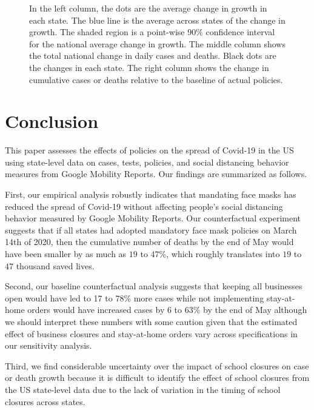 \documentclass[3p, longtitle]{elsarticle}
\theoremstyle{definition}
\begin{document}
\begin{figure}[ht]
\begin{minipage}{\linewidth}
    \begin{flushleft}
      \footnotesize In the left column, the dots are the average
      change in growth in each state. The blue line is the average
      across states of the change in growth. The shaded region is a
      point-wise 90\% confidence interval for the national average
      change in growth.  The middle column shows the total national
      change in daily cases and deaths. Black dots are the changes in each
      state.  The right column shows the change in cumulative cases or
      deaths relative to the baseline of actual policies.
    \end{flushleft}
  \end{minipage}
\end{figure}




\afterpage{\clearpage}

\section{Conclusion}


This paper assesses the effects of policies on the spread of Covid-19 in the US using state-level data on cases, tests, policies, and social distancing behavior measures from Google Mobility Reports. Our findings are summarized as follows.

First, our empirical analysis robustly indicates that mandating face masks has
reduced the spread of Covid-19 without affecting people's social
distancing behavior measured by Google Mobility Reports. Our
counterfactual experiment suggests that
if all states had  adopted mandatory face mask policies on March 14th of 2020, then the cumulative number of deaths by the end of May would have been smaller by as much as  $19$ to $47$\%, which roughly translates into $19$ to $47$  thousand saved lives.

Second, our baseline counterfactual analysis suggests that keeping all businesses open would have led to 17 to 78\% more cases  while not implementing stay-at-home orders would have increased cases by 6 to 63\% by the end of May although we should interpret these numbers with some caution given that the estimated effect of business closures and stay-at-home orders vary across specifications in our sensitivity analysis.

Third, we find considerable uncertainty over  the impact of school closures on case or death growth because it is difficult to identify the effect of school closures from the US state-level data due to the lack of variation in the timing of school closures across states.
\end{document}
